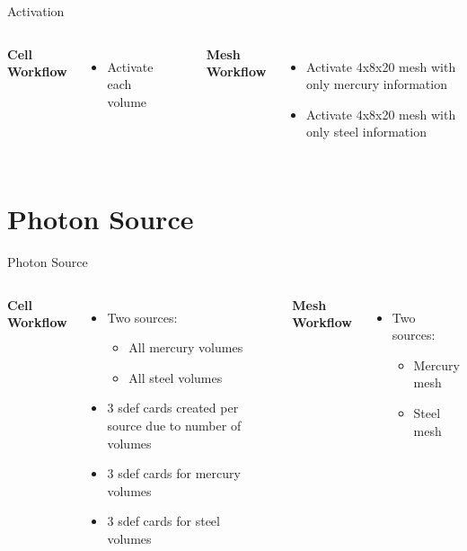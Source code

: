 \documentclass{beamer}
\begin{document}
\begin{frame}{Activation}
\begin{columns}[T]
        \textbf{Cell Workflow}
        \begin{itemize}[<+->]
                \item<2->{Activate each volume}
        \end{itemize}

        \rule{.1mm}{.7\textheight}

        \textbf{Mesh Workflow}
        \begin{itemize}[<+->]
                \item<2->{Activate 4x8x20 mesh with only mercury information}
                \item<3->{Activate 4x8x20 mesh with only steel information}
        \end{itemize}
\end{columns}
\end{frame}

\section{Photon Source}
\begin{frame}{Photon Source}
\begin{columns}[T]
        \textbf{Cell Workflow}
        \begin{itemize}[<+->]
                \item<2->{Two sources:}
			\begin{itemize}[<+->]
				\item<3->{All mercury volumes}
				\item<4->{All steel volumes}
			\end{itemize}
		\item<5->{3 sdef cards created per source due to number of volumes}
		\item<6->{3 sdef cards for mercury volumes}
		\item<6->{3 sdef cards for steel volumes}
        \end{itemize}

        \rule{.1mm}{.7\textheight}

        \textbf{Mesh Workflow}
        \begin{itemize}[<+->]
                \item<2->{Two sources:}
			\begin{itemize}[<+->]
				\item<3->{Mercury mesh}
				\item<4->{Steel mesh}
			\end{itemize}
        \end{itemize}
\end{columns}
\end{frame}
\end{document}
